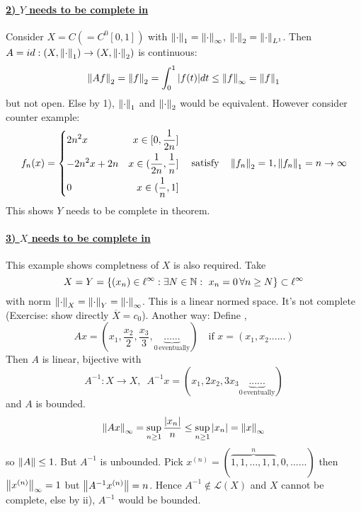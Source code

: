 \documentclass{article}
\begin{document}
\paragraph{\underline{\textbf{2) $Y$ needs to be complete in }}}
\begin{example}[Completeness of $Y$]\nl
Consider $X=C(=C^0[0,1])$ with $\left\|{\cdot}\right\|_1=\left\|{\cdot}\right\|_\infty$, $\left\|{\cdot}\right\|_2=\left\|{\cdot}\right\|_{L^1}$. Then $A=id:(X,\left\|{\cdot}\right\|_1)\to(X,\left\|{\cdot}\right\|_2)$ is continuous:
$$
\left\|{Af}\right\|_2
=\left\|{f}\right\|_2
=\int_0^1|f(t)|dt
\leq\left\|{f}\right\|_\infty
=\left\|{f}\right\|_1
$$
but not open. Else by 1),  $\left\|{\cdot}\right\|_1$ and $\left\|{\cdot}\right\|_2$ would be equivalent. However consider counter example:
\begin{equation}\nonumber
f_n(x)=\left\{
\begin{split}
    &{2n^2x} &x\in[0,\frac{1}{2n}]\\
    &{-2n^2x+2n} &x\in(\frac{1}{2n},\frac{1}{n}]\\
    &0 &x\in(\frac{1}{n},1]\\
\end{split}
\right.\quad\text{satisfy}\quad\left\|{f_n}\right\|_2=1,\left\|{f_n}\right\|_1=n\to\infty
\end{equation}
This shows $Y$ needs to be complete in theorem.
\end{example}

\paragraph{\underline{\textbf{3) $X$ needs to be complete in }}}
\begin{example}[Completeness of $X$]\nl
This example shows completness of $X$ is also required.
Take 
$$
X=Y=\{(x_n)\in\ell^\infty:\exists N \in \natu: \ x_n=0\,\forall n\geq N\}\subset\ell^\infty
$$
with norm $\left\|{\cdot}\right\|_X=\left\|{\cdot}\right\|_Y=\left\|{\cdot}\right\|_\infty$. This is a linear normed space. It's not complete (Exercise: show directly $\overline{X}=c_0$). Another way:
Define , 
$$
Ax=(x_1,\frac{x_2}{2},\frac{x_3}{3},\underbrace{......}_{0\,\text{eventually}})\quad \text{if} \,\,x=(x_1,x_2......)
$$
Then $A$ is linear, bijective with 
$$
A^{-1}:X\to X, \,\,\,A^{-1}x=(x_1,2x_2,3x_3\underbrace{......}_{0\,\text{eventually}})
$$
and $A$ is bounded. 
$$
\left\|{Ax}\right\|_\infty=\sup_{n\geq1}\frac{|x_n|}{n}\leq\sup_{n\geq1}|x_n|=\left\|{x}\right\|_\infty
$$
so $\left\|{A}\right\|\leq1$. But $A^{-1}$ is unbounded. 
Pick $x^{(n)}=(\overbrace{1,1,\ldots, 1,1}^{n},0,......)$ then $\left\|{x^{(n)}}\right\|_\infty=1$ but $\left\|{A^{-1}x^{(n)}}\right\|=n$. Hence $A^{-1}\not\in\mathcal{L}(X)$ and $X$ cannot be complete, else by  ii), $A^{-1}$ would be bounded.
\end{example}
\end{document}
